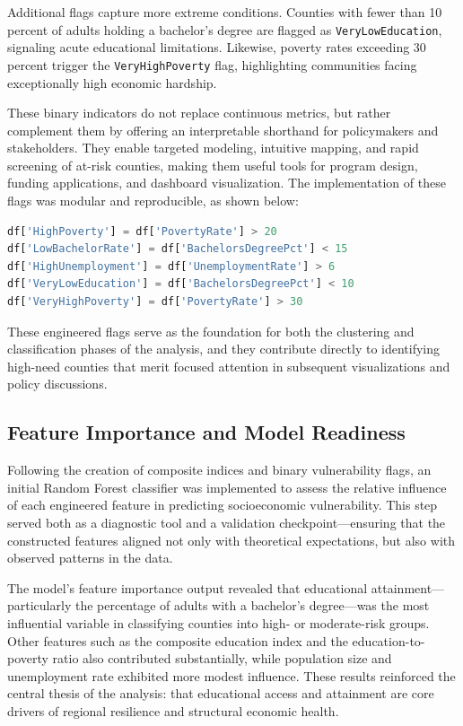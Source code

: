 \documentclass{llncs}
\begin{document}
Additional flags capture more extreme conditions. Counties with fewer than 10 percent of adults holding a bachelor’s degree are flagged as \texttt{VeryLowEducation}, signaling acute educational limitations. Likewise, poverty rates exceeding 30 percent trigger the \texttt{VeryHighPoverty} flag, highlighting communities facing exceptionally high economic hardship.

These binary indicators do not replace continuous metrics, but rather complement them by offering an interpretable shorthand for policymakers and stakeholders. They enable targeted modeling, intuitive mapping, and rapid screening of at-risk counties, making them useful tools for program design, funding applications, and dashboard visualization. The implementation of these flags was modular and reproducible, as shown below:

\begin{lstlisting}[language=Python, caption={Creating Binary Risk Flags}]
df['HighPoverty'] = df['PovertyRate'] > 20
df['LowBachelorRate'] = df['BachelorsDegreePct'] < 15
df['HighUnemployment'] = df['UnemploymentRate'] > 6
df['VeryLowEducation'] = df['BachelorsDegreePct'] < 10
df['VeryHighPoverty'] = df['PovertyRate'] > 30
\end{lstlisting}

These engineered flags serve as the foundation for both the clustering and classification phases of the analysis, and they contribute directly to identifying high-need counties that merit focused attention in subsequent visualizations and policy discussions.

\subsection{Feature Importance and Model Readiness}

Following the creation of composite indices and binary vulnerability flags, an initial Random Forest classifier was implemented to assess the relative influence of each engineered feature in predicting socioeconomic vulnerability. This step served both as a diagnostic tool and a validation checkpoint—ensuring that the constructed features aligned not only with theoretical expectations, but also with observed patterns in the data.

The model's feature importance output revealed that educational attainment—particularly the percentage of adults with a bachelor's degree—was the most influential variable in classifying counties into high- or moderate-risk groups. Other features such as the composite education index and the education-to-poverty ratio also contributed substantially, while population size and unemployment rate exhibited more modest influence. These results reinforced the central thesis of the analysis: that educational access and attainment are core drivers of regional resilience and structural economic health.
\end{document}
